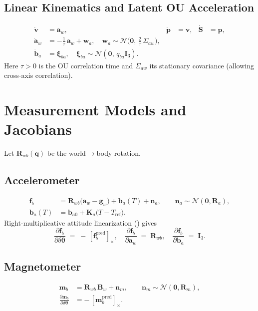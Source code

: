 \documentclass[11pt]{article}
\newcommand{\vect}[1]{\bm{#1}}
\newcommand{\mat}[1]{\bm{#1}}
\newcommand{\quat}[1]{\mathbf{#1}}
\newcommand{\I}{\mat{I}}
\newcommand{\skx}[1]{\left[ #1 \right]_\times}
\begin{document}
\subsection{Linear Kinematics and Latent OU Acceleration}
\begin{align}
  \dot{\vect{v}} &= \vect{a}_w, &
  \dot{\vect{p}} &= \vect{v}, &
  \dot{\vect{S}} &= \vect{p},
  \label{eq:lin-chain}\\
  \dot{\vect{a}}_w &= -\tfrac{1}{\tau}\,\vect{a}_w + \vect{w}_a, \quad
  \vect{w}_a \sim \mathcal{N}\!\bigl(\vect{0},\, \tfrac{2}{\tau}\,\Sigma_{aw}\bigr),
  \label{eq:ou-ct}\\
  \dot{\vect{b}}_a &= \vect{\xi}_{ba}, \quad \vect{\xi}_{ba} \sim \mathcal{N}(\vect{0},\, q_{ba}\I_3).
  \label{eq:ba-ct}
\end{align}
Here \(\tau>0\) is the OU correlation time and \(\Sigma_{aw}\) its stationary covariance
(allowing cross-axis correlation).

\section{Measurement Models and Jacobians}
\label{sec:meas}
Let \(\mat{R}_{wb}(\quat{q})\) be the world\(\to\)body rotation.

\subsection{Accelerometer}
\begin{align}
  \vect{f}_b &= \mat{R}_{wb}\bigl(\vect{a}_w - \vect{g}_w\bigr) + \vect{b}_a(T) + \vect{n}_a,
  \qquad \vect{n}_a \sim \mathcal{N}(\vect{0},\mat{R}_a),
  \label{eq:acc-meas}\\
  \vect{b}_a(T) &= \vect{b}_{a0} + \mat{K}_a \bigl(T - T_{\mathrm{ref}}\bigr).
  \label{eq:ba-temp}
\end{align}
Right-multiplicative attitude linearization () gives
\begin{equation}
  \frac{\partial \vect{f}_b}{\partial \delta\vect{\theta}}
  \;=\; -\,\skx{\vect{f}_b^{\mathrm{pred}}}, \quad
  \frac{\partial \vect{f}_b}{\partial \vect{a}_w} \;=\; \mat{R}_{wb}, \quad
  \frac{\partial \vect{f}_b}{\partial \vect{b}_a} \;=\; \I_3.
  \label{eq:acc-jacs}
\end{equation}

\subsection{Magnetometer}
\begin{align}
  \vect{m}_b &= \mat{R}_{wb}\,\vect{B}_w + \vect{n}_m, \qquad
  \vect{n}_m \sim \mathcal{N}(\vect{0},\mat{R}_m),
  \label{eq:mag-meas}\\
  \frac{\partial \vect{m}_b}{\partial \delta\vect{\theta}}
  &= -\,\skx{\vect{m}_b^{\mathrm{pred}}}.
  \label{eq:mag-jac}
\end{align}
\end{document}
